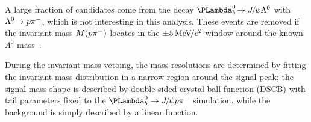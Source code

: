 A large fraction of \LbJpsippi candidates come from the decay $\decay{\Lb}{\jpsi\Lambda^0}$ with $\Lambda^0\!\rightarrow p\pi^-$, 
which is not interesting in this analysis.
These events are removed if the invariant mass $M(p{{\pi}^-})$ locates in the $\pm 5\text{\,Me\kern -0.1em V\!/}c^2$ window around the known $\Lambda^0$ mass~\supercite{PDG2020}.

During the invariant mass vetoing, 
the mass resolutions are determined by fitting the invariant mass distribution in a narrow region around the signal peak; 
the signal mass shape is described by double-sided crystal ball function (DSCB) with tail parameters fixed to
the $\LbJpsiPPi$ simulation, 
while the background is simply described by a linear function.

